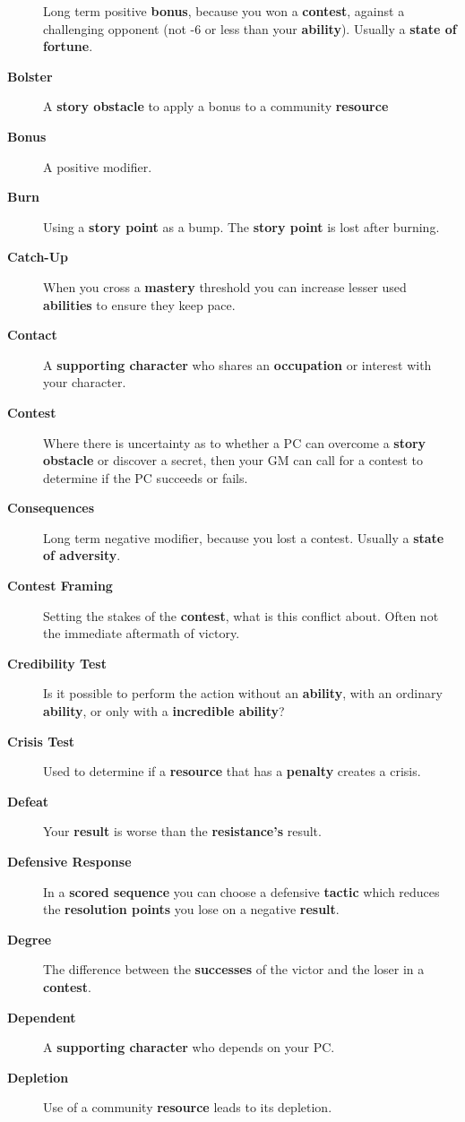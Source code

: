 \documentclass[
  11pt,
]{article}
\begin{document}
\begin{description}
Long term positive \textbf{bonus}, because you won a \textbf{contest},
against a challenging opponent (not -6 or less than your
\textbf{ability}). Usually a \textbf{state of fortune}.
\item[\textbf{Bolster}]
A \textbf{story obstacle} to apply a bonus to a community
\textbf{resource}
\item[\textbf{Bonus}]
A positive modifier.
\item[\textbf{Burn}]
Using a \textbf{story point} as a bump. The \textbf{story point} is lost
after burning.
\item[\textbf{Catch-Up}]
When you cross a \textbf{mastery} threshold you can increase lesser used
\textbf{abilities} to ensure they keep pace.
\item[\textbf{Contact}]
A \textbf{supporting character} who shares an \textbf{occupation} or
interest with your character.
\item[\textbf{Contest}]
Where there is uncertainty as to whether a PC can overcome a
\textbf{story obstacle} or discover a secret, then your GM can call for
a contest to determine if the PC succeeds or fails.
\item[\textbf{Consequences}]
Long term negative modifier, because you lost a contest. Usually a
\textbf{state of adversity}.
\item[\textbf{Contest Framing}]
Setting the stakes of the \textbf{contest}, what is this conflict about.
Often not the immediate aftermath of victory.
\item[\textbf{Credibility Test}]
Is it possible to perform the action without an \textbf{ability}, with
an ordinary \textbf{ability}, or only with a \textbf{incredible
ability}?
\item[\textbf{Crisis Test}]
Used to determine if a \textbf{resource} that has a \textbf{penalty}
creates a crisis.
\item[\textbf{Defeat}]
Your \textbf{result} is worse than the \textbf{resistance's} result.
\item[\textbf{Defensive Response}]
In a \textbf{scored sequence} you can choose a defensive \textbf{tactic}
which reduces the \textbf{resolution points} you lose on a negative
\textbf{result}.
\item[\textbf{Degree}]
The difference between the \textbf{successes} of the victor and the
loser in a \textbf{contest}.
\item[\textbf{Dependent}]
A \textbf{supporting character} who depends on your PC.
\item[\textbf{Depletion}]
Use of a community \textbf{resource} leads to its depletion.

\end{description}
\end{document}
